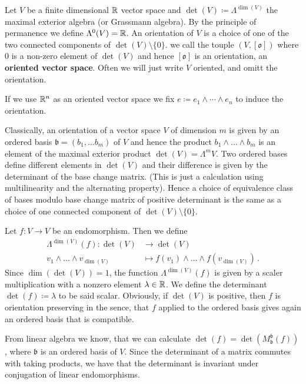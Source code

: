 \begin{definition}[Orientation]
	Let $V$ be a finite dimensional $\mathbb{R}$ vector space and $\det(V)\coloneq \Lambda^{\dim(V)}$ the maximal exterior algebra (or Grassmann algebra). By the principle of permanence we define $\Lambda^0(V)=\mathbb{R}$. An orientation of $V$ is a choice of one of the two connected components of $\det(V)\setminus \{0\}$. we call the touple $(V,[\mathfrak{o}])$ where $\mathfrak{0}$ is a non-zero element of $\det(V)$ and hence $[\mathfrak{o}]$ is an orientation, an \textbf{oriented vector space}. Often we will just write $V$ oriented, and omitt the orientation.
\end{definition}
\begin{definition}[Convention]
    If we use $\mathbb{R}^n$ as an oriented vector space we fix $e\coloneq e_1\wedge \cdots \wedge e_n$ to induce the orientation.
\end{definition}
\begin{remark}
	Classically, an orientation of a vector space $V$ of dimension $m$ is given by an ordered basis $\mathfrak{b}=(b_1,\dots b_m)$ of $V$ and hence the product $b_1\wedge \dots \wedge b_m$ is an element of the maximal exterior product $\det(V)=\Lambda^mV$. Two ordered bases define different elements in $\det(V)$ and their difference is given by the determinant of the base change matrix. (This is just a calculation using multilinearity and the alternating property). Hence a choice of equivalence class of bases modulo base change matrix of positive determinant is the same as a choice of one connected component of $\det(V)\setminus \{0\}$.
\end{remark}
\begin{definition}
	Let $f:V\to V$ be an endomorphism. Then we define 
	\begin{align}
		\Lambda^{\dim(V)}(f):\det(V)&\to \det(V)\\
v_1\wedge \dots \wedge v_{\dim(V)}&\mapsto f(v_1)\wedge \dots \wedge f(v_{\dim(V)})\,.
	\end{align} Since $\dim(\det(V))=1$, the function $\Lambda^{\dim(V)}(f)$ is given by a scaler multiplication with a nonzero element $\lambda \in \mathbb{R}$. We define the determinant $\det(f)\coloneq \lambda$  to be said scalar. Obviously, if $\det(V)$ is positive, then $f$ is orientation preserving in the sence, that $f$ applied to the ordered basis gives again an ordered basis that is compatible.
\end{definition}
\begin{remark}\label{rem:orient-calculateDeterminatViaMatrixDeterminant}
	From linear algebra we know, that we can calculate $\det(f)=\det(M^{\mathfrak{b}}_\mathfrak{b}(f))$, where $\mathfrak{b}$ is an ordered basis of $V$. Since the determinant of a matrix commutes with taking products, we have that the determinant is invariant under conjugation of linear endomorphisms.
\end{remark}
